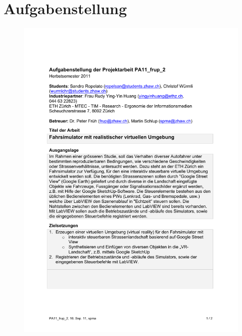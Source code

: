 \section{Aufgabenstellung}
\begin{figure}[h]
	\flushleft
	\includegraphics[width=\linewidth]{src/aufgabenstellung_seite1.pdf}
\end{figure}
